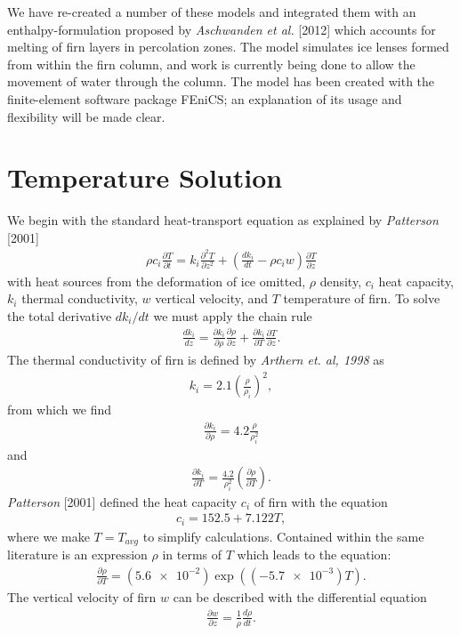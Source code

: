 \documentclass{article}%
\begin{document}
We have re-created a number of these models and integrated them with an enthalpy-formulation proposed by \emph{Aschwanden et al.} [2012] which accounts for melting of firn layers in percolation zones.  The model simulates ice lenses formed from within the firn column, and work is currently being done to allow the movement of water through the column.  The model has been created with the finite-element software package FEniCS; an explanation of its usage and flexibility will be made clear.

\section{Temperature Solution}

We begin with the standard heat-transport equation as explained by \emph{Patterson} [2001]
\begin{align*}
  \rho c_i \frac{\partial T}{\partial t} = 
    k_i \frac{\partial^2 T}{\partial z^2} +
    \left( \frac{dk_i}{dt} - \rho c_i w \right) \frac{\partial T}{\partial z}
\end{align*}
with heat sources from the deformation of ice omitted, $\rho$ density, $c_i$ heat capacity, $k_i$ thermal conductivity, $w$ vertical velocity, and $T$ temperature of firn.  To solve the total derivative $dk_i/dt$ we must apply the chain rule
\begin{align*}
  \frac{dk_i}{dz} = 
  \frac{\partial k_i}{\partial \rho} \frac{\partial \rho}{\partial z} + 
  \frac{\partial k_i}{\partial T} \frac{\partial T}{\partial z}.
\end{align*}
The thermal conductivity of firn is defined by \emph{Arthern et. al, 1998} as
\begin{align*}
  k_i = 2.1 \left(\frac{\rho}{\rho_i}\right)^2,
\end{align*}
from which we find
\begin{align*}
  \frac{\partial k_i}{\partial \rho} = 
    4.2 \frac{\rho}{\rho_i^2}
\end{align*}
and
\begin{align*}
  \frac{\partial k_i}{\partial T} = 
    \frac{4.2}{\rho_i^2} \left( \frac{\partial \rho}{\partial T} \right).
\end{align*}
\emph{Patterson} [2001] defined the heat capacity $c_i$ of firn with the equation
\begin{align*}
  c_i = 152.5 + 7.122 T,
\end{align*}
where we make $T=T_{avg}$ to simplify calculations.  Contained within the same literature is an expression $\rho$ in terms of $T$ which leads to the equation:
\begin{align*}
  \frac{\partial \rho}{\partial T} = 
    (\SI{5.6e-2}) \exp ((\SI{-5.7e-3})T).
\end{align*}
The vertical velocity of firn $w$ can be described with the differential equation
\begin{align*}
  \frac{\partial w}{\partial z} = \frac{1}{\rho} \frac{d \rho}{dt}.
\end{align*}
\end{document}
